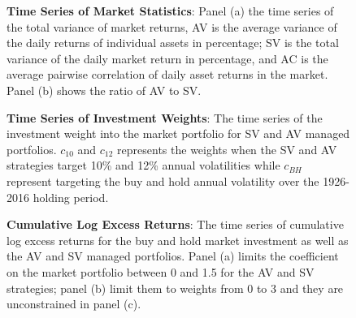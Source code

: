 %		
	\begin{figure}[!htb]
		\caption{{\bf Time Series of Market Statistics}: Panel (a) the time series of the total variance of market returns, AV is the average variance of the daily returns of individual assets in percentage; SV is the total variance of the daily market return in percentage, and AC is the average pairwise correlation of daily asset returns in the market. Panel (b) shows the ratio of AV to SV.} \label{fig:time_series}
		\begin{adjustbox}{width=\textwidth}
			
		\end{adjustbox}
		\begin{adjustbox}{width=\textwidth}
			
		\end{adjustbox}
	\end{figure}
\clearpage
	\begin{figure}[!htb]
		\caption{{\bf Time Series of Investment Weights}: The time series of the investment weight into the market portfolio for SV and AV managed portfolios. $c_{10}$ and $c_{12}$ represents the weights when the SV and AV strategies target 10\% and 12\% annual volatilities while $c_{BH}$ represent targeting the buy and hold annual volatility over the 1926-2016 holding period.} \label{fig:weights_plot}
		\begin{adjustbox}{width=\textwidth}
		
	\end{adjustbox}
	\end{figure}
\clearpage
\begin{figure}[!htb]
		\caption{{\bf Cumulative Log Excess Returns}: The time series of cumulative log excess returns for the buy and hold market investment as well as the AV and SV managed portfolios. Panel (a) limits the coefficient on the market portfolio between 0 and 1.5 for the AV and SV strategies; panel (b) limit them to weights from 0 to 3 and they are unconstrained in panel (c). } \label{fig:fig_returns}
		\vspace{-4mm}
		\begin{adjustbox}{width=\textwidth}
		
		\end{adjustbox}
\end{figure}
